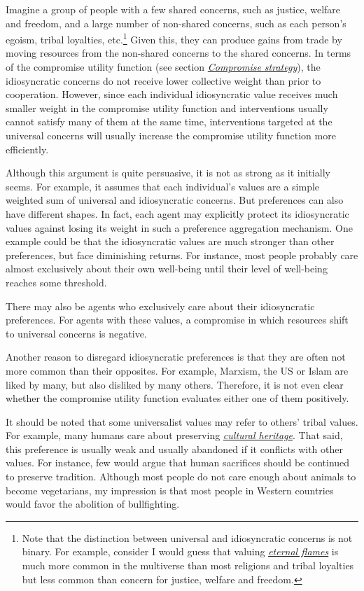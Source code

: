 Imagine a group of people with a few shared concerns, such as justice,
welfare and freedom, and a large number of non-shared concerns, such as
each person's egoism, tribal loyalties, etc.\footnote{Note that the
  distinction between universal and idiosyncratic concerns is not
  binary. For example, consider I would guess that valuing
  \href{https://en.wikipedia.org/wiki/Eternal_flame}{\emph{eternal
  flames}} is much more common in the multiverse than most religions and
  tribal loyalties but less common than concern for justice, welfare and
  freedom.} Given this, they can produce gains from trade by moving
resources from the non-shared concerns to the shared concerns. In terms
of the compromise utility function (see section
\protect\hyperlink{compromise-strategy}{\emph{Compromise
strategy}}), the idiosyncratic concerns do not receive lower
collective weight than prior to cooperation. However, since each
individual idiosyncratic value receives much smaller weight in the
compromise utility function and interventions usually cannot satisfy
many of them at the same time, interventions targeted at the universal
concerns will usually increase the compromise utility function more
efficiently.

Although this argument is quite persuasive, it is not as strong as it
initially seems. For example, it assumes that each individual's values
are a simple weighted sum of universal and idiosyncratic concerns. But
preferences can also have different shapes. In fact, each agent may
explicitly protect its idiosyncratic values against losing its weight in
such a preference aggregation mechanism. One example could be that the
idiosyncratic values are much stronger than other preferences, but face
diminishing returns. For instance, most people probably care almost
exclusively about their own well-being until their level of well-being
reaches some threshold.

There may also be agents who exclusively care about their idiosyncratic
preferences. For agents with these values, a compromise in which
resources shift to universal concerns is negative.

Another reason to disregard idiosyncratic preferences is that they are
often not more common than their opposites. For example, Marxism, the US
or Islam are liked by many, but also disliked by many others. Therefore,
it is not even clear whether the compromise utility function evaluates
either one of them positively.

It should be noted that some universalist values may refer to others'
tribal values. For example, many humans care about preserving
\href{https://en.wikipedia.org/wiki/Cultural_heritage}{\emph{cultural
heritage}}. That said, this preference is usually weak and usually
abandoned if it conflicts with other values. For instance, few would
argue that human sacrifices should be continued to preserve tradition.
Although most people do not care enough about animals to become
vegetarians, my impression is that most people in Western countries
would favor the abolition of bullfighting.

